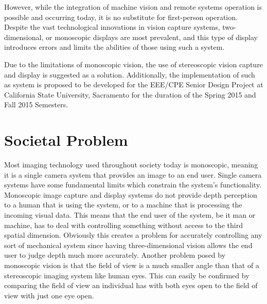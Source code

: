 \documentclass[12pt, journal]{IEEEtran}
\begin{document}
However, while the integration of machine vision and remote systems operation is possible and occurring today, it is no substitute for first-person operation.  Despite the vast technological innovations in vision capture systems, two-dimensional, or monoscopic displays are most prevalent, and this type of display introduces errors and limits the abilities of those using such a system.

Due to the limitations of monoscopic vision, the use of stereoscopic vision capture and display is suggested as a solution.  Additionally, the implementation of such as system is proposed to be developed for the EEE/CPE Senior Design Project at California State University, Sacramento for the duration of the Spring 2015 and Fall 2015 Semesters.

\section{Societal Problem}
Most imaging technology used throughout society today is monoscopic, meaning it is a single camera system that provides an image to an end user. Single camera systems have some fundamental limits which constrain the system's functionality. Monoscopic image capture and display systems do not provide depth perception to a human that is using the system, or to a machine that is processing the incoming visual data. This means that the end user of the system, be it man or machine, has to deal with controlling something without access to the third spatial dimension. Obviously this creates a problem for accurately controlling any sort of mechanical system since having three-dimensional vision allows the end user to judge depth much more accurately. Another problem posed by monoscopic vision is that the field of view is a much smaller angle than that of a stereoscopic imaging system like human eyes. This can easily be confirmed by comparing the field of view an individual has with both eyes open to the field of view with just one eye open.
\end{document}

